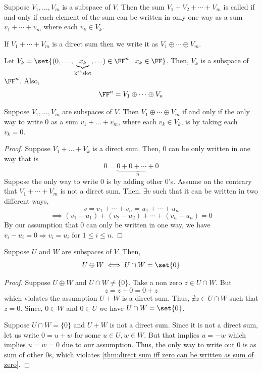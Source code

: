 \begin{definition}
    Suppose $V_1,\ldots,V_m$ is a subspace of $V$. Then the sum $V_1+V_2+\cdots+V_m$ is called  if and only if 
    each element of the sum can be written in only one way as a sum $v_1+\cdots+v_m$ where each $v_k \in V_k$. 
\end{definition}

\begin{notation}
    If $V_1+\cdots+V_m$ is a direct sum then we write it as $V_1 \oplus \cdots \oplus V_m$. 
\end{notation}

\begin{example}
    Let $V_k = \set{(0,\ldots,\underbrace{x_k}_{\text{k}^{th} \text{slot}},\ldots) \in \FF^n \mid x_k \in \FF}$. Then, $V_k$ is a subspace
    of $\FF^n$. Also,
    \[ \FF^n = V_1 \oplus \cdots \oplus V_n \]
\end{example}

\begin{theorem}
    \label{thm:direct sum iff zero can be written as sum of zero}
    Suppose $V_1,\ldots,V_m$ are subspaces of $V$. Then $V_1 \oplus \cdots \oplus V_m$ if and only if the only way to write $0$ as a sum 
    $v_1+\ldots+v_m$, where each $v_k \in V_k$, is by taking each $v_k=0$.
\end{theorem}

\begin{proof}
    Suppose $V_1 + \ldots + V_k$ is a direct sum. Then, $0$ can be only written in one way that is
    \[ 0 = \underbrace{0+0+\cdots+0}_{n} \]
    Suppose  the only way to write $0$ is by adding other $0$'s. Assume on the contrary that $V_1 + \cdots + V_m$ is not a direct sum.
    Then, $\exists v$ such that it can be written in two different ways,
    \[ v= v_1 + \cdots + v_n = u_1 + \cdots + u_n \]
    \[ \implies (v_1-u_1)+(v_2-u_2)+ \cdots + (v_n-u_n)=0 \]
    By our assumption that $0$ can only be written in one way, we have $v_i-u_i=0 \Rightarrow v_i = u_i$ for $1 \le i \le n$.
\end{proof}

\begin{theorem}
    \label{thm: direct sum iff intersection is zero}
    Suppose $U$ and $W$ are subspaces of $V$. Then, 
    \[ U \oplus W \iff U \cap W = \set{0} \]
\end{theorem}

\begin{proof}
    Suppose $U \oplus W$ and $U \cap W \neq \{0\}$. Take a non zero $z \in U \cap W$. But 
    \[ z = z + 0 = 0 + z \]
    which violates the assumption $U + W$ is a direct sum. Thus, $\nexists z \in U \cap W$ such that $z = 0$.
    Since, $0 \in W$ and $0 \in U$ we have $U \cap W = \set{0}$.

    Suppose $U \cap W = \{0\}$ and $U + W$ is not a direct sum. Since it is not a direct sum, let us write
    $0 = u+w$ for some $u \in U,w \in W$. But that implies $u=-w$ which implies $u=w=0$ due to our assumption.
    Thus, the only way to write out $0$ is as sum of other $0$s, which violates \cref{thm:direct sum iff zero can be written as sum of zero}.
\end{proof}